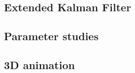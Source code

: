\documentclass[11pt,a4paper]{article}
\begin{document}
\subsection{Extended Kalman Filter}




\subsection{Parameter studies}


\subsection{3D animation}


\end{document}
